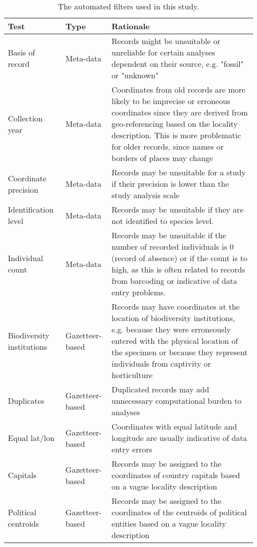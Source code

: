 \documentclass[fleqn,10pt,lineno]{wlpeerj} %
\begin{document}
\begin{table}[!h]

\caption{\label{tab:tabletests}The automated filters used in this study.}
\centering
\fontsize{9}{11}\selectfont
\begin{tabular}[t]{>{\raggedright\arraybackslash}p{2cm}>{\raggedright\arraybackslash}p{2.5cm}>{\raggedright\arraybackslash}p{10cm}}
\toprule
Test & Type & Rationale\\
\midrule
\rowcolor{gray!6}  Basis of record & Meta-data & Records might be unsuitable or unreliable for certain analyses dependent on their source, e.g. "fossil" or "unknown"\\
Collection year & Meta-data & Coordinates from old records are more likely to be imprecise or erroneous coordinates since they are derived from  geo-referencing based on the locality description. This is more problematic for older records, since names or borders of places may change\\
\rowcolor{gray!6}  Coordinate precision & Meta-data & Records may be unsuitable for a study if their precision is lower than the study analysis scale\\
Identification level & Meta-data & Records may be unsuitable if they are not identified to species level.\\
\rowcolor{gray!6}  Individual count & Meta-data & Records may be unsuitable if the number of recorded individuals is 0 (record of absence) or if the count is to high, as this is often related to records from barcoding or indicative of data entry problems.\\
\addlinespace
Biodiversity institutions & Gazetteer-based & Records may have coordinates at the location of biodiversity institutions, e.g. because they were erroneously entered with the physical location of the specimen or because they represent individuals from captivity or horticulture\\
\rowcolor{gray!6}  Duplicates & Gazetteer-based & Duplicated records may add unnecessary computational burden to analyses\\
Equal lat/lon & Gazetteer-based & Coordinates with equal latitude and longitude are usually indicative of data entry errors\\
\rowcolor{gray!6}  Capitals & Gazetteer-based & Records may be assigned to the coordinates of country capitals based on a vague locality description\\
Political centroids & Gazetteer-based & Records may be assigned to the coordinates of the centroids of political entities based on a vague locality description\\

\end{tabular}
\end{table}
\end{document}

